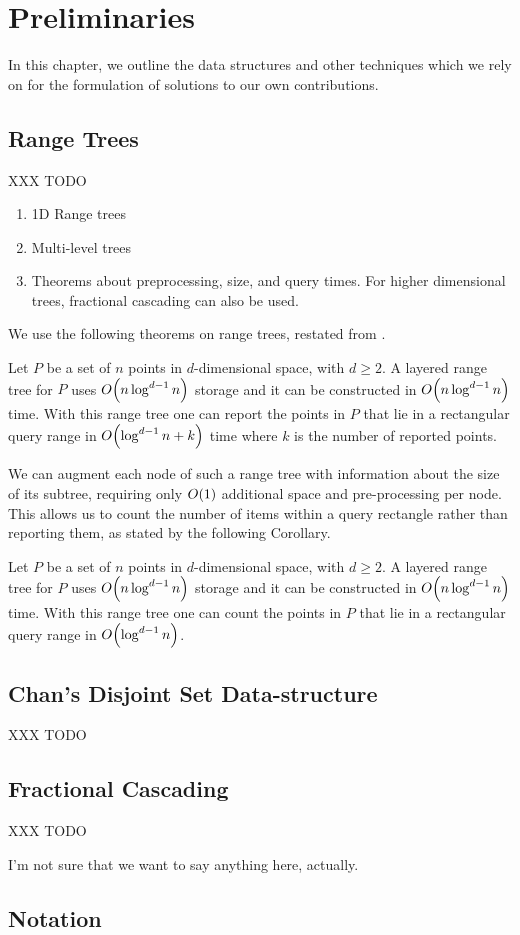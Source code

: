 \chapter{Preliminaries}
\label{:prelim}

In this chapter, we outline the data structures and other techniques which we rely on for the formulation of solutions to our own contributions.

\section{Range Trees}
\label{:prelim:range-trees}

XXX TODO
\begin{enumerate}
 \item 1D Range trees
 \item Multi-level trees
 \item Theorems about preprocessing, size, and query times.  For higher dimensional trees, fractional cascading can also be used.
\end{enumerate}

We use the following theorems on range trees, restated from \cite{debergch5}.

\begin{theorem}
\label{th:rangetree}
Let $P$ be a set of $n$ points in $d$-dimensional space, with $d \geq 2$. A layered range tree for $P$ uses $O\!\left(n \log^{d-1}{n}\right)$ storage and it can be constructed in $O\!\left(n \log^{d-1}{n}\right)$ time. With this range tree one can report the points in $P$ that lie in a rectangular query range in $O\!\left(\log^{d-1}{n} + k\right)$ time where $k$ is the number of reported points.
\end{theorem}

We can augment each node of such a range tree with information about the size of its subtree, requiring only $O\!\left(1\right)$ additional space and pre-processing per node.  This allows us to count the number of items within a query rectangle rather than reporting them, as stated by the following Corollary.

\begin{corollary}
\label{cor:rangetree}
Let $P$ be a set of $n$ points in $d$-dimensional space, with $d \geq 2$. A layered range tree for $P$ uses $O\!\left(n \log^{d-1}{n}\right)$ storage and it can be constructed in $O\!\left(n \log^{d-1}{n}\right)$ time. With this range tree one can count the points in $P$ that lie in a rectangular query range in $O\!\left(\log^{d-1}{n}\right)$.
\end{corollary}


\section{Chan's Disjoint Set Data-structure}
\label{:prelim:chan}

XXX TODO

\section{Fractional Cascading}
\label{:prelim:fractional-cascading}

XXX TODO

I'm not sure that we want to say anything here, actually.



\section{Notation}
\label{:prelim:notation}


